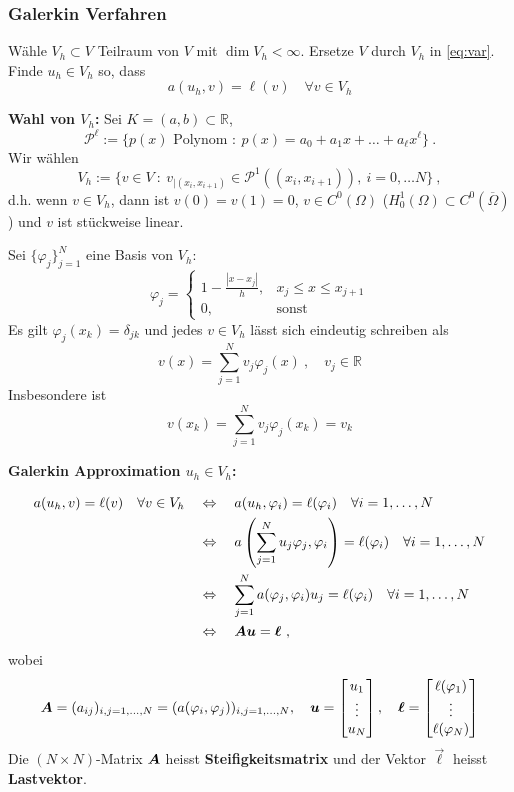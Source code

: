 \subsubsection*{Galerkin Verfahren}
Wähle $V_h \subset V$ Teilraum von $V$ mit $\dim V_h < \infty$. Ersetze $V$ durch $V_h$ in \eqref{eq:var}. 
Finde $u_h \in V_h$ so, dass
\[
    a(u_h, v) = \ell(v) \quad \forall v \in V_h
\]

\textbf{Wahl von $V_h$:} Sei $K = (a, b) \subset \mathbb R$, 
\[
    \mathcal P^\ell := \{ p(x) \text{ Polynom } : \ p(x) = a_0 + a_1 x + \ldots + a_\ell x^\ell \} \ .
\]
Wir wählen
\[
    V_h := \{ v \in V \ : \ v_{|(x_i, x_{i+1})} \in \mathcal P^1( (x_i, x_{i+1}) ), \ i = 0, \ldots N \} \ ,
\]
d.h. wenn $v \in V_h$, dann ist $v(0) = v(1) = 0$, $v \in C^0(\Omega)$ ($H_0^1(\Omega) \subset C^0(\overline \Omega)$) 
und $v$ ist stückweise linear.

Sei $\{ \varphi_j \}_{j=1}^N$ eine Basis von $V_h$:
\[
    \varphi_j = 
    \begin{cases}
        1 - \frac{|x - x_j|}{h}, & x_j \leq x \leq x_{j+1} \\
        0, & \text{sonst}
    \end{cases}
\]
Es gilt $\varphi_j(x_k) = \delta_{jk}$ und jedes $v \in V_h$ lässt sich eindeutig schreiben als
\[
    v(x) = \sum_{j=1}^N v_j \varphi_j(x) \ , \quad v_j \in \mathbb R
\]
Insbesondere ist 
\[
    v(x_k) = \sum_{j=1}^N v_j \varphi_j(x_k) = v_k
\]

\textbf{Galerkin Approximation $u_h \in V_h$:}

\begin{align*}
    a(u_h, v) = \ell(v) \quad \forall v \in V_h \quad
        &\Leftrightarrow \quad a(u_h, \varphi_i) = \ell( \varphi_i) \quad \forall i = 1, \ldots, N  \\
        &\Leftrightarrow \quad a\left( \sum_{j=1}^N u_j \varphi_j, \varphi_i \right) = \ell(\varphi_i) \quad \forall i=1, \ldots, N \\
        &\Leftrightarrow \quad \sum_{j=1}^N a(\varphi_j, \varphi_i) u_j = \ell(\varphi_i) \quad \forall i=1, \ldots, N \\
        &\Leftrightarrow \quad \boldsymbol{A} \boldsymbol{u} = \boldsymbol{\ell} \ ,
\end{align*}
wobei
\[
    \boldsymbol{A} = (a_{ij})_{i,j = 1,\ldots, N} = ( a(\varphi_i, \varphi_j))_{i,j=1,\ldots,N}, \quad
    \boldsymbol{u} = \begin{bmatrix} u_1 \\ \vdots \\ u_N \end{bmatrix}, \quad
    \boldsymbol{\ell} = \begin{bmatrix} \ell(\varphi_1) \\ \vdots \\ \ell(\varphi_N) \end{bmatrix}
\]
Die $(N \times N)$-Matrix $\boldsymbol{A}$ heisst \textbf{Steifigkeitsmatrix} und der Vektor $\vec \ell$ heisst
\textbf{Lastvektor}.

